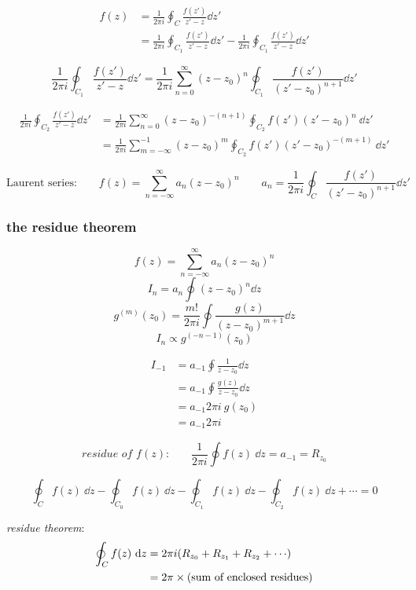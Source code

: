 \documentclass[10pt, a4paper, twocolumn]{article}
\newcommand{\deff}[1]{\par \noindent \textit{#1}: }
\begin{document}
\begin{equation*}
\begin{aligned}
f(z)&=\frac{1}{2\pi i}\oint_C
\frac{f(z')}{z'-z}\dd z'
\\&=\frac{1}{2\pi i}
\oint_{C_1}\frac{f(z')}{z'-z}\dd z'
-\frac{1}{2\pi i}
\oint_{C_1}\frac{f(z')}{z'-z}\dd z'
\end{aligned}
\end{equation*}

\[\frac{1}{2\pi i}
\oint_{C_1}\frac{f(z')}{z'-z}\dd z'
=\frac{1}{2\pi i}
\sum_{n=0}^\infty (z-z_0)^n
\oint_{C_1}\frac{f(z')}{(z'-z_0)^{n+1}}\dd z'\]

\begin{equation*}
\begin{aligned}
\frac{1}{2\pi i}
\oint_{C_2}\frac{f(z')}{z'-z}\dd z'
&=\frac{1}{2\pi i}
\sum_{n=0}^\infty (z-z_0)^{-(n+1)}
\oint_{C_2}
f(z')(z'-z_0)^n\ \dd z'
\\&=\frac{1}{2\pi i}
\sum_{m=-\infty}^{-1}(z-z_0)^m
\oint_{C_2}f(z')(z'-z_0)^{-(m+1)}\ \dd z'
\end{aligned}
\end{equation*}

\[\text{Laurent series:}\qquad
f(z)=\sum_{n=-\infty}^\infty
a_n(z-z_0)^n
\qquad a_n=\frac{1}{2\pi i}
\oint_C\frac{f(z')}{(z'-z_0)^{n+1}}\dd z'\]

\subsubsection{the residue theorem}
\[f(z)=\sum_{n=-\infty}^\infty
a_n(z-z_0)^n\]
\[I_n=a_n\oint (z-z_0)^n\dd z\]
\[g^{(m)}(z_0)
=\frac{m!}{2\pi i}
\oint\frac{g(z)}{(z-z_0)^{m+1}}\dd z\]
\[I_n\propto g^{(-n-1)}(z_0)\]

\begin{equation*}
\begin{aligned}
I_{-1}&=
a_{-1}\oint\frac{1}{z-z_0}\dd z
\\&= a_{-1}\oint\frac{g(z)}{z-z_0}\dd z
\\&=a_{-1}2\pi i\ g(z_0)
\\&=a_{-1}2\pi i
\end{aligned}
\end{equation*}

\[\textit{residue of $f(z)$:}\qquad
\frac{1}{2\pi i}
\oint f(z)\ \dd z=a_{-1}=R_{z_0} \]

\[
\oint_Cf(z)\ \dd z
-\oint_{C_0}f(z)\ \dd z
-\oint_{C_1}f(z)\ \dd z
-\oint_{C_2}f(z)\ \dd z
+\cdots=0\]

\deff{residue theorem}
\begin{equation*}
\begin{aligned}
\oint_Cf(z)\ \dd z&=2\pi i
\pqty{R_{z_0}+R_{z_1}+R_{z_2}+\cdots}
\\&=2\pi\times
\text{(sum of enclosed residues)}
\end{aligned}
\end{equation*}
\end{document}
